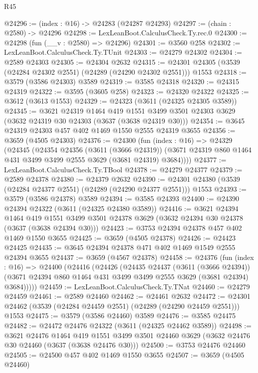 \begin{lexlean}{R45}
\begin{coremodule}
@24296 := (index : @16) -> @24283 (@24287 @24293)
@24297 := (chain : @2580) -> @24296
@24298 := LexLeanBoot.CalculusCheck.Ty.rec.{0}
@24300 := @24298 (fun (__v : @2580) => @24296)
@24301 := @3560 @258
@24302 := LexLeanBoot.CalculusCheck.Ty.TUnit
@24303 := @24279 @24302
@24304 := @2589 @24303
@24305 := @24304 @2632
@24315 := @24301 @24305 (@3539 (@24284 @24302 @2551) (@24289 (@24290 @24302 @2551))) @1553
@24318 := @3579 (@3586 @24303) @3589
@24319 := @3585 @24318
@24320 := @24315 @24319
@24322 := @3595 (@3605 @258)
@24323 := @24320 @24322
@24325 := @3612 (@3613 @1553)
@24329 := @24323 (@3611 (@24325 @24305 @3589))
@24345 := @3621
    @24319
    @1464
    @419
    @1551
    @3499
    @3501
    @24303
    @3629
    (@3632 @24319 @30 @24303 (@3637 (@3638 @24319 @30)))
@24354 := @3645 @24319 @24303 @457 @402 @1469 @1550 @2555 @24319 @3655
@24356 := @3659 (@4505 @24303)
@24376 := @24300
    (fun (index : @16) =>
    @24329
      (@24345
        (@24354
          @24356
          (@3611 (@3666 @24319))
          (@3671 @24319 @860 @1464 @431 @3499 @3499 @2555 @3629 (@3681 @24319) @3684))))
@24377 := LexLeanBoot.CalculusCheck.Ty.TBool
@24378 := @24279 @24377
@24379 := @2589 @24378
@24380 := @24379 @2632
@24390 := @24301 @24380 (@3539 (@24284 @24377 @2551) (@24289 (@24290 @24377 @2551))) @1553
@24393 := @3579 (@3586 @24378) @3589
@24394 := @3585 @24393
@24400 := @24390 @24394 @24322 (@3611 (@24325 @24380 @3589))
@24416 := @3621
    @24394
    @1464
    @419
    @1551
    @3499
    @3501
    @24378
    @3629
    (@3632 @24394 @30 @24378 (@3637 (@3638 @24394 @30)))
@24423 := @3753 @24394 @24378 @457 @402 @1469 @1550 @3655
@24425 := @3659 (@4505 @24378)
@24426 := @24423 @24425
@24435 := @3645 @24394 @24378 @471 @402 @1469 @1549 @2555 @24394 @3655
@24437 := @3659 (@4567 @24378)
@24458 := @24376
    (fun (index : @16) =>
    @24400
      (@24416
        (@24426
          (@24435
            @24437
            (@3611 (@3666 @24394))
            (@3671 @24394 @860 @1464 @431 @3499 @3499 @2555 @3629 (@3681 @24394) @3684)))))
@24459 := LexLeanBoot.CalculusCheck.Ty.TNat
@24460 := @24279 @24459
@24461 := @2589 @24460
@24462 := @24461 @2632
@24472 := @24301 @24462 (@3539 (@24284 @24459 @2551) (@24289 (@24290 @24459 @2551))) @1553
@24475 := @3579 (@3586 @24460) @3589
@24476 := @3585 @24475
@24482 := @24472 @24476 @24322 (@3611 (@24325 @24462 @3589))
@24498 := @3621
    @24476
    @1464
    @419
    @1551
    @3499
    @3501
    @24460
    @3629
    (@3632 @24476 @30 @24460 (@3637 (@3638 @24476 @30)))
@24500 := @3753 @24476 @24460
@24505 := @24500 @457 @402 @1469 @1550 @3655
@24507 := @3659 (@4505 @24460)

\end{coremodule}
\end{lexlean}
